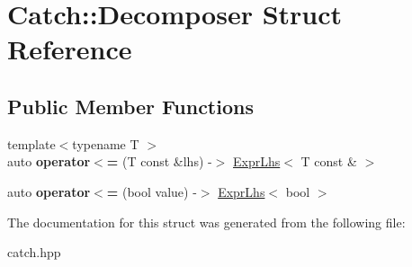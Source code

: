\hypertarget{structCatch_1_1Decomposer}{}\section{Catch\+:\+:Decomposer Struct Reference}
\label{structCatch_1_1Decomposer}
\subsection*{Public Member Functions}
\begin{DoxyCompactItemize}
\item 
{\footnotesize template$<$typename T $>$ }\\auto {\bfseries operator$<$=} (T const \&lhs) -\/$>$ \hyperlink{classCatch_1_1ExprLhs}{Expr\+Lhs}$<$ T const \& $>$\hypertarget{structCatch_1_1Decomposer_a4b1e5e844c20e5a90e3d759d216674cd}{}\label{structCatch_1_1Decomposer_a4b1e5e844c20e5a90e3d759d216674cd}

\item 
auto {\bfseries operator$<$=} (bool value) -\/$>$ \hyperlink{classCatch_1_1ExprLhs}{Expr\+Lhs}$<$ bool $>$\hypertarget{structCatch_1_1Decomposer_aac129b94903ae1339d5709049d83613b}{}\label{structCatch_1_1Decomposer_aac129b94903ae1339d5709049d83613b}

\end{DoxyCompactItemize}


The documentation for this struct was generated from the following file\+:\begin{DoxyCompactItemize}
\item 
catch.\+hpp\end{DoxyCompactItemize}
